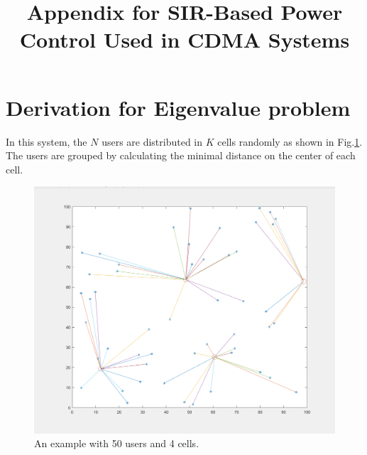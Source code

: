 \documentclass[12pt]{article}
\begin{document}
\title{Appendix for SIR-Based Power Control Used in CDMA Systems}




\maketitle

\section{Derivation for Eigenvalue problem}
In this system, the $N$ users are distributed in $K$ cells randomly as shown in Fig.\ref{fig:t}.
The users are grouped by calculating the minimal distance on the center of each cell.
\begin{figure}[th]
	\centering
	\includegraphics[scale=0.4]{distribution}
	\caption{An example with 50 users and 4 cells.}
	\label{fig:t}
\end{figure}
\end{document}
